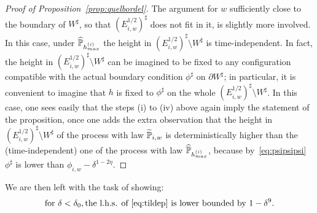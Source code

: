 \documentclass[AHL,Unicode,longabstracts,published]{cedram}
\renewcommand{\P}{\mathbb{P}}
\renewcommand{\d}{{\sharp }}
\let\oldtilde\tilde
\renewcommand*{\tilde}[1]{\mathchoice{\widetilde{#1}}{\widetilde{#1}}{\oldtilde{#1}}{\oldtilde{#1}}}
\let\oldhat\hat
\renewcommand*{\hat}[1]{\mathchoice{\widehat{#1}}{\widehat{#1}}{\oldhat{#1}}{\oldhat{#1}}}
\begin{document}
\begin{proof}[Proof of Proposition~\ref{prop:quelbordel}]
The argument for $w$ sufficiently close to the boundary of $W^\d$, so that $(E^{1/2}_{i,w})^\d$ does not fit in it, is slightly more involved. In this case, under $\hat\P_{h^{(i)}_{max}}$ the height in $(E^{1/2}_{i,w})^\d\setminus W^\d$ is time-independent. In fact, the height in $(E^{1/2}_{i,w})^\d\setminus W^\d$ can be imagined to be fixed to any configuration compatible with the actual boundary condition $\phi^\d$ on $\partial W^\d$; in particular, it is convenient to imagine that $h$ is fixed to $\phi^\d$ on the whole $(E^{1/2}_{i,w})^\d\setminus W^\d$. In this case, one sees easily that the steps (i) to (iv) above again imply the statement of the proposition, once one adds the extra observation that the height in $(E^{1/2}_{i,w})^\d\setminus W^\d$ of the process with law $\tilde \P_{i,w}$ is deterministically higher than the (time-independent) one of the process with law $\hat \P_{h^{(i)}_{max}}$, because by~\eqref{eq:psipsipsi} $\phi^\d$ is lower than $\phi_{i,w}-\delta^{1-2\eta}$.
\end{proof}

We are then left with the task of showing:
\begin{equation}\label{eq:leftto}
\text{for }\delta<\delta_0, \text{the l.h.s. of~\eqref{eq:tildep} is lower bounded by $1-\delta^9$.}
\end{equation}
\end{document}
